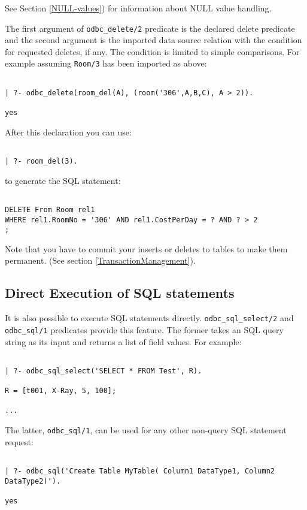 See Section \ref{NULL-values}) for information about NULL value
handling.

The first argument of {\tt odbc\_delete/2} predicate is the declared delete
predicate and the second argument is the imported data source relation
with the condition for requested deletes, if any.  The condition is
limited to simple comparisons.  For example assuming
{\tt Room/3} has been imported as above:
\begin{verbatim}

| ?- odbc_delete(room_del(A), (room('306',A,B,C), A > 2)). 

yes
\end{verbatim}

After this declaration you can use:
\begin{verbatim}

| ?- room_del(3).
\end{verbatim}

to generate the SQL statement:
\begin{verbatim}

DELETE From Room rel1 
WHERE rel1.RoomNo = '306' AND rel1.CostPerDay = ? AND ? > 2
;
\end{verbatim}

Note that you have to commit your inserts or deletes to tables to make
them permanent.  (See section \ref{TransactionManagement}).

\subsection{ Direct Execution of SQL statements}
It is also possible to execute SQL statements directly. 
{\tt odbc\_sql\_select/2} and {\tt odbc\_sql/1} predicates provide this 
feature.  The former takes an SQL query string as its input and returns 
a list of field values.  For example:
\begin{verbatim}

| ?- odbc_sql_select('SELECT * FROM Test', R).

R = [t001, X-Ray, 5, 100];

...

\end{verbatim}
The latter, {\tt odbc\_sql/1}, can be used for any other non-query SQL statement request:
\begin{verbatim}

| ?- odbc_sql('Create Table MyTable( Column1 DataType1, Column2 DataType2)').

yes
\end{verbatim}

